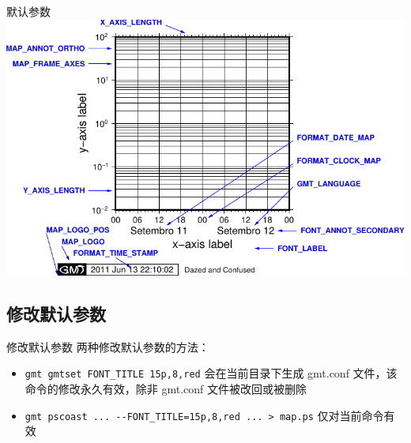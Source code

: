 \documentclass[UTF8, 11pt]{ctexbeamer}
\begin{document}
\begin{frame}{默认参数}
\includegraphics[width=\textwidth]{GMT_Defaults_3}
\end{frame}
\subsection{修改默认参数}
\begin{frame}[fragile]{修改默认参数}
两种修改默认参数的方法：
\begin{itemize}
\item \verb|gmt gmtset FONT_TITLE 15p,8,red| 会在当前目录下生成 gmt.conf 文件，该命令的修改永久有效，除非 gmt.conf 文件被改回或被删除
\item \verb|gmt pscoast ... --FONT_TITLE=15p,8,red ... > map.ps| 仅对当前命令有效
\end{itemize}
\end{frame}
\end{document}
